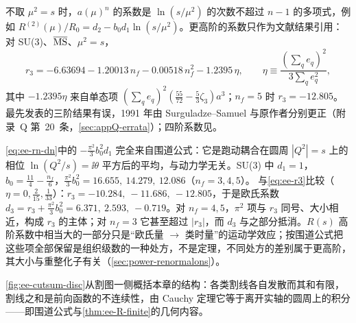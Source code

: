 不取 $\mu^2=s$ 时，$a(\mu)^n$ 的系数是 $\ln(s/\mu^2)$ 的次数不超过 $n-1$ 的多项式，例如 $R^{(2)}(\mu)/R_0=d_2-b_0d_1\ln(s/\mu^2)$。更高阶的系数只作为文献结果引用：对 SU(3)、$\overline{\rm MS}$、$\mu^2=s$，
\begin{equation}\label{eq:ee-r3}
r_3=-6.63694-1.20013\,n_f-0.00518\,n_f^2-1.2395\,\eta,\qquad \eta\equiv\frac{(\sum_qe_q)^2}{3\sum_qe_q^2},
\end{equation}
其中 $-1.2395\eta$ 来自单态项 $(\sum_qe_q)^2(\frac{55}{72}-\frac53\zeta_3)a^3$\cite{GorishniiKataevLarin1991,SurguladzeSamuel1991}；$n_f=5$ 时 $r_3=-12.805$。最先发表的三阶结果\cite{Gorishnii:1988bc}有误，1991 年由 Surguladze--Samuel 与原作者分别更正（附录~Q 第~20~条，\cref{sec:appQ-errata}）；四阶系数见\cite{BaikovChetyrkinKuhn2008}。

\begin{example}[$O(a^3)$ 的 $\pi^2$ 项]\label{ex:ee-pi2}
\cref{eq:ee-rn-dn}中的 $-\frac{\pi^2}3b_0^2d_1$ 完全来自围道公式：它是跑动耦合在圆周 $|Q^2|=s$ 上的相位 $\ln(Q^2/s)=\ii\theta$ 平方后的平均，与动力学无关。SU(3) 中 $d_1=1$，$b_0=\frac{11}4-\frac{n_f}6$，$\frac{\pi^2}3b_0^2=16.655,\ 14.279,\ 12.086$（$n_f=3,4,5$）。%
与\cref{eq:ee-r3}比较（$\eta=0,\frac2{15},\frac1{33}$）：$r_3=-10.284,\ -11.686,\ -12.805$，于是欧氏系数 $d_3=r_3+\frac{\pi^2}3b_0^2=6.371,\ 2.593,\ -0.719$。对 $n_f=4,5$，$\pi^2$ 项与 $r_3$ 同号、大小相近，构成 $r_3$ 的主体；对 $n_f=3$ 它甚至超过 $|r_3|$，而 $d_3$ 与之部分抵消。$R(s)$ 高阶系数中相当大的一部分只是“欧氏量 $\to$ 类时量”的运动学效应\cite{KrasnikovPivovarov1982,KataevStarshenko1995}；按围道公式把这些项全部保留是组织级数的一种处方，不是定理，不同处方的差别属于更高阶，其大小与重整化子有关（\cref{sec:power-renormalons}）。
\end{example}

\cref{fig:ee-cutsum-disc}从割图一侧概括本章的结构：各类割线各自发散而其和有限，割线之和是前向函数的不连续性，由 Cauchy 定理它等于离开实轴的圆周上的积分——即围道公式与\cref{thm:ee-R-finite}的几何内容。

